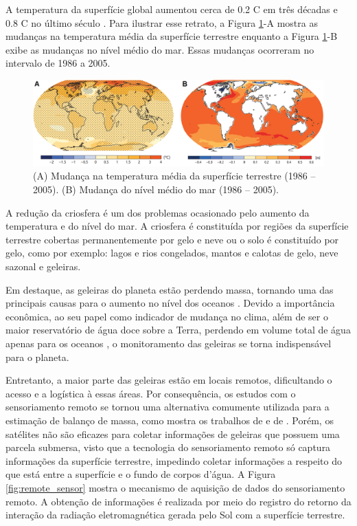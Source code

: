 A temperatura da superfície global aumentou cerca de 0.2 \textordmasculine C em três décadas e 0.8 \textordmasculine C no último século \cite{hansen2006global}. Para ilustrar esse retrato, a Figura \ref{fig:ast-and-sl}-A mostra as mudanças na temperatura média da superfície terrestre enquanto a Figura \ref{fig:ast-and-sl}-B exibe as mudanças no nível médio do mar. Essas mudanças ocorreram no intervalo de 1986 a 2005.

\begin{figure}[H]
    \centering
    \includegraphics[scale=0.27]{dados/figuras/ast-and-sl.png}
    \caption{(A) Mudança na temperatura média da superfície terrestre (1986 -- 2005). (B) Mudança do nível médio do mar (1986 -- 2005).}
    \vspace{-0.8em}
    \label{fig:ast-and-sl}
\end{figure}

A redução da criosfera é um dos problemas ocasionado pelo aumento da temperatura e do nível do mar. A criosfera é constituída por regiões da superfície terrestre cobertas permanentemente por gelo e neve ou o solo é constituído por gelo, como por exemplo: lagos e rios congelados, mantos e calotas de gelo, neve sazonal e geleiras.

Em destaque, as geleiras do planeta estão perdendo massa, tornando uma das principais causas para o aumento no nível dos oceanos \cite{rietbroek2016revisiting}. Devido a importância econômica, ao seu papel como indicador de mudança no clima, além de ser o maior reservatório de água doce sobre a Terra, perdendo em volume total de água apenas para os oceanos \cite{pinto2015crise}, o monitoramento das geleiras se torna indispensável para o planeta.

Entretanto, a maior parte das geleiras estão em locais remotos, dificultando o acesso e a logística à essas áreas. 
Por consequência, os estudos com o sensoriamento remoto se tornou uma alternativa comumente utilizada para a estimação de balanço de massa, como mostra os trabalhos de \cite{rojas2016darwin} e de \cite{mendonca2013greyglacier}.
Porém, os satélites não são eficazes para coletar informações de geleiras que possuem uma parcela submersa, visto que a tecnologia do sensoriamento remoto só captura informações da superfície terrestre, impedindo coletar informações a respeito do que está entre a superfície e o fundo de corpos d'água. 
A Figura \ref{fig:remote_sensor} mostra o mecanismo de aquisição de dados do sensoriamento remoto. A obtenção de informações é realizada por meio do registro do retorno da interação da radiação eletromagnética gerada pelo Sol com a superfície terrestre. 

